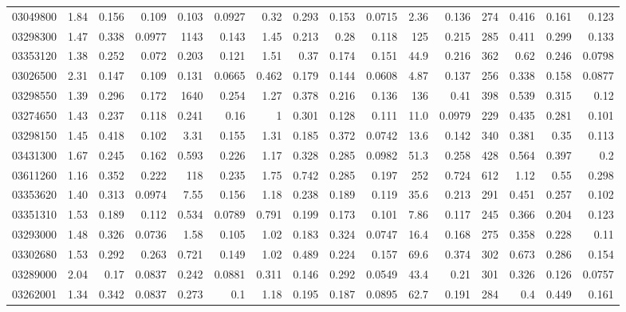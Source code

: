 \begin{longtable}{l r rr rr rr rr rr rr rr}
03049800 & 1.84 & 0.156 & {0.109} & 0.103 & {0.0927} & 0.32 & {0.293} & 0.153 & {0.0715} & 2.36 & {0.136} & 274 & {0.416} & 0.161 & {0.123}\\
03298300 & 1.47 & 0.338 & {0.0977} & 1143 & {0.143} & 1.45 & {0.213} & 0.28 & {0.118} & 125 & {0.215} & 285 & {0.411} & 0.299 & {0.133}\\
03353120 & 1.38 & 0.252 & {0.072} & 0.203 & {0.121} & 1.51 & {0.37} & 0.174 & {0.151} & 44.9 & {0.216} & 362 & {0.62} & 0.246 & {0.0798}\\
03026500 & 2.31 & 0.147 & {0.109} & 0.131 & {0.0665} & 0.462 & {0.179} & 0.144 & {0.0608} & 4.87 & {0.137} & 256 & {0.338} & 0.158 & {0.0877}\\
03298550 & 1.39 & 0.296 & {0.172} & 1640 & {0.254} & 1.27 & {0.378} & 0.216 & {0.136} & 136 & {0.41} & 398 & {0.539} & 0.315 & {0.12}\\
03274650 & 1.43 & 0.237 & {0.118} & 0.241 & {0.16} & 1 & {0.301} & 0.128 & {0.111} & 11.0 & {0.0979} & 229 & {0.435} & 0.281 & {0.101}\\
03298150 & 1.45 & 0.418 & {0.102} & 3.31 & {0.155} & 1.31 & {0.185} & 0.372 & {0.0742} & 13.6 & {0.142} & 340 & {0.381} & 0.35 & {0.113}\\
03431300 & 1.67 & 0.245 & {0.162} & 0.593 & {0.226} & 1.17 & {0.328} & 0.285 & {0.0982} & 51.3 & {0.258} & 428 & {0.564} & 0.397 & {0.2}\\
03611260 & 1.16 & 0.352 & {0.222} & 118 & {0.235} & 1.75 & {0.742} & 0.285 & {0.197} & 252 & {0.724} & 612 & {1.12} & 0.55 & {0.298}\\
03353620 & 1.40 & 0.313 & {0.0974} & 7.55 & {0.156} & 1.18 & {0.238} & 0.189 & {0.119} & 35.6 & {0.213} & 291 & {0.451} & 0.257 & {0.102}\\
03351310 & 1.53 & 0.189 & {0.112} & 0.534 & {0.0789} & 0.791 & {0.199} & 0.173 & {0.101} & 7.86 & {0.117} & 245 & {0.366} & 0.204 & {0.123}\\
03293000 & 1.48 & 0.326 & {0.0736} & 1.58 & {0.105} & 1.02 & {0.183} & 0.324 & {0.0747} & 16.4 & {0.168} & 275 & {0.358} & 0.228 & {0.11}\\
03302680 & 1.53 & 0.292 & {0.263} & 0.721 & {0.149} & 1.02 & {0.489} & 0.224 & {0.157} & 69.6 & {0.374} & 302 & {0.673} & 0.286 & {0.154}\\
03289000 & 2.04 & 0.17 & {0.0837} & 0.242 & {0.0881} & 0.311 & {0.146} & 0.292 & {0.0549} & 43.4 & {0.21} & 301 & {0.326} & 0.126 & {0.0757}\\
03262001 & 1.34 & 0.342 & {0.0837} & 0.273 & {0.1} & 1.18 & {0.195} & 0.187 & {0.0895} & 62.7 & {0.191} & 284 & {0.4} & 0.449 & {0.161}\\

\end{longtable}
